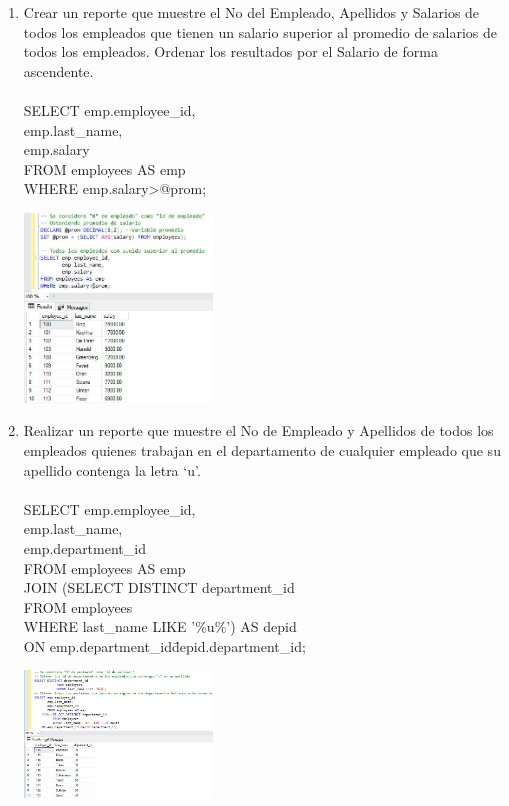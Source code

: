 \begin{enumerate}[1.]
	\item Crear un reporte que muestre el No del Empleado, Apellidos y Salarios de todos los empleados que tienen un salario superior al promedio de salarios de todos los empleados. Ordenar los resultados por el Salario de forma ascendente.
	\\
	\\SELECT emp.employee\_id, \\
	emp.last\_name, \\
	emp.salary \\
	FROM employees AS emp \\
	WHERE emp.salary>@prom; \\
	\begin{center}
	\includegraphics[width=5cm]{./Imagenes/actividad0902} 
	\end{center}

	\item Realizar un reporte que muestre el No de Empleado y Apellidos de todos los empleados quienes trabajan en el departamento de cualquier empleado que su apellido contenga la letra ‘u’.
	\\
	\\SELECT emp.employee\_id, \\
	emp.last\_name, \\
	emp.department\_id \\
	FROM employees AS emp \\
	JOIN (SELECT DISTINCT department\_id \\
		  FROM employees \\
		  WHERE last\_name LIKE '\%u\%') AS depid \\
	ON emp.department\_id\=depid.department\_id; \\
	\begin{center}
	\includegraphics[width=5cm]{./Imagenes/actividad0903} 
	\end{center}


\end{enumerate}
